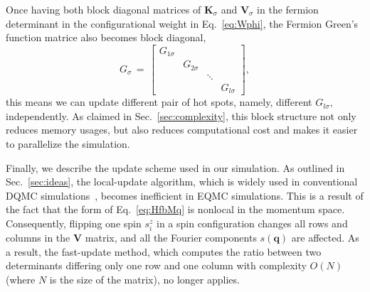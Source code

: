 \documentclass[aps,prx,twocolumn,superscriptaddress,showpacs,floatfix]{revtex4-1}
\begin{document}
Once having both block diagonal matrices of $\mathbf{K}_{\sigma}$ and $\mathbf{V}_{\sigma}$ in the fermion determinant in the configurational weight in Eq.~\eqref{eq:Wphi}, the Fermion Green's function matrice also becomes block diagonal,
\begin{equation}
G_{\sigma}\,=\,\left[\begin{array}{cccc}
G_{1\sigma}\\
 & G_{2\sigma}\\
 &  & \ddots\\
 &  &  & G_{l\sigma}
\end{array}\right],
\end{equation}
this means we can update different pair of hot spots, namely, different $G_{l\sigma}$, independently.
As claimed in Sec.~\ref{sec:complexity}, this block structure not only reduces memory usages, but also reduces computational cost and makes it easier to parallelize the simulation.


Finally, we describe the update scheme used in our simulation.
As outlined in Sec.~\ref{sec:ideas}, the local-update algorithm, which is widely used in conventional DQMC simulations~\cite{BSS1981,Hirsch_1983,Hirsch_1985,White1989,AssaadEvertz2008}, becomes inefficient in EQMC simulations.
This is a result of the fact that the form of Eq.~\eqref{eq:HfbMq} is nonlocal in the momentum space.
Consequently, flipping one spin $s_i^z$ in a spin configuration changes all rows and columns in the $\mathbf V$ matrix, and all the Fourier components $s(\bm q)$ are affected.
As a result, the fast-update method, which computes the ratio between two determinants differing only one row and one column with complexity $O(N)$ (where $N$ is the size of the matrix), no longer applies.
\end{document}
